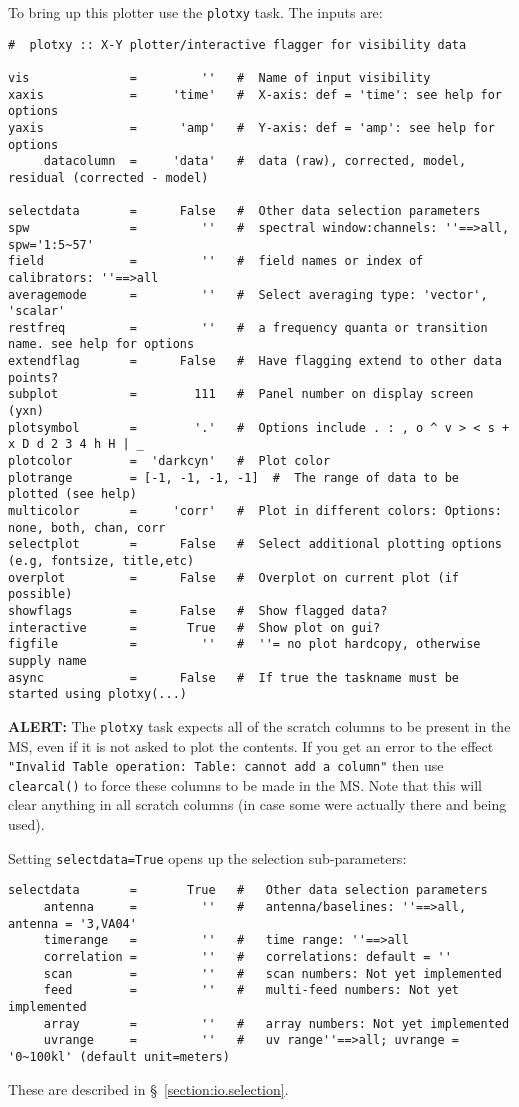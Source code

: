 To bring up this plotter use the {\tt plotxy} task.  The inputs are: 
\small
\begin{verbatim}
#  plotxy :: X-Y plotter/interactive flagger for visibility data

vis              =         ''   #  Name of input visibility
xaxis            =     'time'   #  X-axis: def = 'time': see help for options
yaxis            =      'amp'   #  Y-axis: def = 'amp': see help for options
     datacolumn  =     'data'   #  data (raw), corrected, model, residual (corrected - model)

selectdata       =      False   #  Other data selection parameters
spw              =         ''   #  spectral window:channels: ''==>all, spw='1:5~57'
field            =         ''   #  field names or index of calibrators: ''==>all
averagemode      =         ''   #  Select averaging type: 'vector', 'scalar'
restfreq         =         ''   #  a frequency quanta or transition name. see help for options
extendflag       =      False   #  Have flagging extend to other data points?
subplot          =        111   #  Panel number on display screen (yxn)
plotsymbol       =        '.'   #  Options include . : , o ^ v > < s + x D d 2 3 4 h H | _
plotcolor        =  'darkcyn'   #  Plot color
plotrange        = [-1, -1, -1, -1]  #  The range of data to be plotted (see help)
multicolor       =     'corr'   #  Plot in different colors: Options: none, both, chan, corr
selectplot       =      False   #  Select additional plotting options (e.g, fontsize, title,etc)
overplot         =      False   #  Overplot on current plot (if possible)
showflags        =      False   #  Show flagged data?
interactive      =       True   #  Show plot on gui?
figfile          =         ''   #  ''= no plot hardcopy, otherwise supply name
async            =      False   #  If true the taskname must be started using plotxy(...)
\end{verbatim}
\normalsize

{\bf ALERT:} The {\tt plotxy} task expects all of the scratch columns to
be present in the MS, even if it is not asked to plot the contents.
If you get an error to the effect {\tt "Invalid Table operation:
Table: cannot add a column"} then use {\tt clearcal()} to force these
columns to be made in the MS.  Note that this will clear anything in
all scratch columns (in case some were actually there and being used).

Setting {\tt selectdata=True} opens up the selection sub-parameters:
\small
\begin{verbatim}
selectdata       =       True   #   Other data selection parameters
     antenna     =         ''   #   antenna/baselines: ''==>all, antenna = '3,VA04' 
     timerange   =         ''   #   time range: ''==>all 
     correlation =         ''   #   correlations: default = '' 
     scan        =         ''   #   scan numbers: Not yet implemented
     feed        =         ''   #   multi-feed numbers: Not yet implemented
     array       =         ''   #   array numbers: Not yet implemented
     uvrange     =         ''   #   uv range''==>all; uvrange = '0~100kl' (default unit=meters)
\end{verbatim}
\normalsize
These are described in \S~\ref{section:io.selection}.

